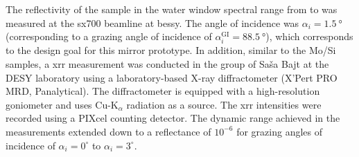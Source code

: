 The reflectivity of the sample in the water window spectral range from  to  was measured at the \gls{sx700} beamline at \gls{bessy}. The angle of incidence was $\alpha_i=\SI{1.5}{\degree}$ (corresponding to a grazing angle of incidence of $\alpha_i^\text{GI} = \SI{88.5}{\degree}$), which corresponds to the design goal for this mirror prototype. In addition, similar to the Mo/Si samples, a \gls{xrr} measurement was 
conducted in the group of Sa\v{s}a Bajt at the DESY laboratory using a laboratory-based X-ray diffractometer 
(X'Pert PRO MRD, Panalytical). The diffractometer is equipped with a high-resolution goniometer and uses Cu-K$_\alpha$ radiation as a source. The \gls{xrr} intensities were recorded using a PIXcel counting detector. The dynamic range achieved in the measurements 
extended down to a reflectance of $10^{-6}$ for grazing angles of incidence of 
$\alpha_i=0^\circ$ to $\alpha_i=3^\circ$.

